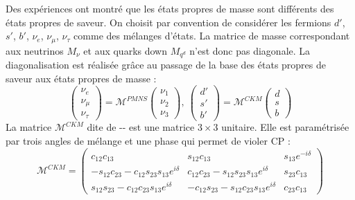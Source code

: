 Des expériences ont montré que les états propres de masse sont différents des états propres de saveur. On choisit par convention de considérer les fermions $d'$, $s'$, $b'$, $\nu_{e}$, $\nu_{\mu}$, $\nu_{\tau}$ comme des mélanges d'états. La matrice de masse correspondant aux neutrinos $M_{\nu}$ et aux quarks down $M_{q^d}$ n'est donc pas diagonale. La diagonalisation est réalisée grâce au passage de la base des états propres de saveur aux états propres de masse :
\begin{equation}
\begin{pmatrix} 
\nu_{e} \\ 
\nu_{\mu} \\ 
\nu_{\tau} 
\end{pmatrix}=\mathcal{M}^{PMNS}
\begin{pmatrix} 
\nu_{1}\\ 
\nu_{2}\\ 
\nu_{3}
\end{pmatrix},\ \begin{pmatrix} 
d' \\ 
s' \\ 
b' 
\end{pmatrix}=\mathcal{M}^{CKM}
\begin{pmatrix} 
d \\ 
s\\ 
b
\end{pmatrix}
\end{equation} 
La matrice $\mathcal{M}^{CKM}$ dite de -- est une matrice $3\times3$ unitaire. Elle est paramétrisée par trois angles de mélange et une phase qui permet de violer CP :
\begin{equation}
\mathcal{M}^{CKM}= 
\begin{pmatrix} 
c_{12}c_{13} & s_{12}c_{13} & s_{13}e^{-i\delta} \\
-s_{12}c_{23}-c_{12}s_{23}s_{13}e^{i\delta} & c_{12}c_{23}-s_{12}s_{23}s_{13}e^{i\delta} & s_{23}c_{13} \\
s_{12}s_{23}-c_{12}c_{23}s_{13}e^{i\delta} & -c_{12}s_{23}-s_{12}c_{23}s_{13}e^{i\delta} & c_{23}c_{13}
\end{pmatrix}
\end{equation} 
 

